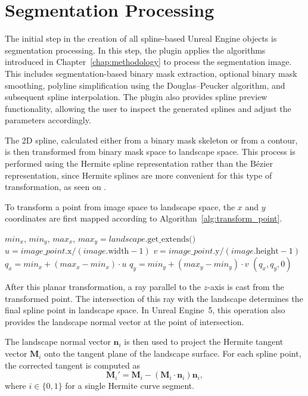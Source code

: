 \section{Segmentation Processing}
\label{sec:segmentation_processing}

The initial step in the creation of all spline-based Unreal Engine objects is segmentation processing. In this step, the plugin applies the algorithms introduced in Chapter~\ref{chap:methodology} to process the segmentation image. This includes segmentation-based binary mask extraction, optional binary mask smoothing, polyline simplification using the Douglas--Peucker algorithm, and subsequent spline interpolation. The plugin also provides spline preview functionality, allowing the user to inspect the generated splines and adjust the parameters accordingly.

The 2D spline, calculated either from a binary mask skeleton or from a contour, is then transformed from binary mask space to landscape space. This process is performed using the Hermite spline representation rather than the B\'ezier representation, since Hermite splines are more convenient for this type of transformation, as seen on .

To transform a point from image space to landscape space, the $x$ and $y$ coordinates are first mapped according to Algorithm~\ref{alg:transform_point}.

{
\begin{algorithmic}[1]
	\State $min_x$, $min_y$, $max_x$, $max_y = \textit{landscape}.\text{get\_extends()}$
	\State
	\State $u = \textit{image\_point}.\text{x} / (\textit{image}.\text{width}-1)$
	\State $v = \textit{image\_point}.\text{y} / (\textit{image}.\text{height}-1)$
	\State
	\State $q_x = min_x + (max_x - min_x)\cdot u$
	\State $q_y = min_y + (max_y - min_y)\cdot v$
	\State
	\Return $(q_x, q_y, 0)$
	\EndProcedure
\end{algorithmic}
\label{alg:transform_point}
}

After this planar transformation, a ray parallel to the $z$-axis is cast from the transformed point. The intersection of this ray with the landscape determines the final spline point in landscape space. In Unreal Engine~5, this operation also provides the landscape normal vector at the point of intersection.

The landscape normal vector $\mathbf{n}_i$ is then used to project the Hermite tangent vector $\mathbf{M}_i$ onto the tangent plane of the landscape surface. For each spline point, the corrected tangent is computed as
\begin{equation}
	\mathbf{M}_i' = \mathbf{M}_i - (\mathbf{M}_i \cdot \mathbf{n}_i)\mathbf{n}_i,
\end{equation}
where $i \in \{0,1\}$ for a single Hermite curve segment.

